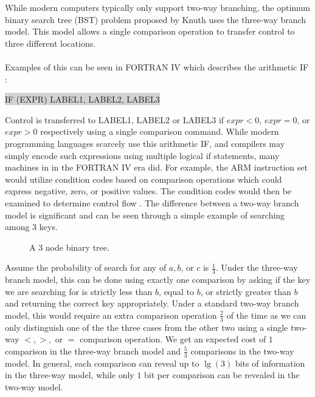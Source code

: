 \documentclass[letterpaper,12pt,titlepage,oneside,final]{book}
\theoremstyle{plain}
\begin{document}
While modern computers typically only support two-way branching, the optimum binary search tree (BST) problem proposed by Knuth uses the three-way branch model. This model allows a single comparison operation to transfer control to three different locations. \\~\\ Examples of this can be seen in FORTRAN IV which describes the arithmetic IF \cite{Dock:228063}:

\colorbox{lightgrey}{ \selectfont \uppercase{IF (expr) label1, label2, label3} } 
 
\noindent Control is transferred to \uppercase{label1}, \uppercase{label2} or \uppercase{label3} if $expr < 0$, $expr=0$, or $expr > 0$ respectively using a single comparison command. While modern programming languages scarcely use this arithmetic IF, and compilers may simply encode such expressions using multiple logical if statements, many machines in in the FORTRAN IV era did. For example, the ARM instruction set would utilize condition codes based on comparison operations which could express negative, zero, or positive values. The condition codes would then be examined to determine control flow \cite{ARM}. The difference between a two-way branch model is significant and can be seen through a simple example of searching among 3 keys.

\begin{figure}[!ht]
\begin{center}

\caption{A 3 node binary tree.}

\end{center}
\end{figure}

Assume the probability of search for any of $a,b$, or $c$ is $\frac{1}{3}$. Under the three-way branch model, this can be done using exactly one comparison by asking if the key we are searching for is strictly less than $b$, equal to $b$, or strictly greater than $b$ and returning the correct key appropriately. Under a standard two-way branch model, this would require an extra comparison operation $\frac{2}{3}$ of the time as we can only distinguish one of the the three cases from the other two using a single two-way $<, >,$ or $=$ comparison operation. We get an expected cost of $1$ comparison in the three-way branch model and $\frac{5}{3}$ comparisons in the two-way model. In general, each comparison can reveal up to $\lg(3)$ bits of information in the three-way model, while only $1$ bit per comparison can be revealed in the two-way model. 
\end{document}
